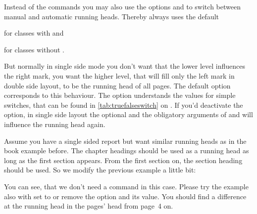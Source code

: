 Instead of the commands you may also use the options  and
 to switch between manual and automatic running
heads. Thereby  always uses the default
\begin{lstcode}[belowskip=\dp\strutbox]
\end{lstcode}
for classes with  and
\begin{lstcode}[belowskip=\dp\strutbox]
\end{lstcode}
for classes without .

But normally in single side mode you don't want that the lower level
influences the right mark, you want the higher level, that
will fill only the left mark in double side layout, to be the running head of
all pages. The default option  corresponds to this
behaviour. The option understands the values for simple switches, that can be
found in  \autoref{tab:truefalseswitch} on
. If you'd deactivate the option, in single
side layout the optional and the obligatory arguments of  and
 will influence the running head again.%
%
\begin{Example}
  Assume you have a single sided report but want similar running heads as in
  the book example before. The chapter headings should be used as a running
  head as long as the first section appears. From the first section on, the
  section heading should be used. So we modify the previous example a little
  bit:
  You can see, that we don't need a  command in this
  case. Please try the example also with  set to
   or remove the option and its value. You should find a
  difference at the running head in the pages' head from page~4 on.
\end{Example}

